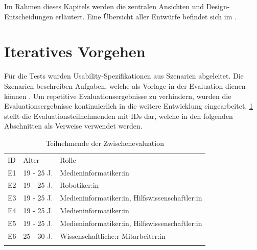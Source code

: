 Im Rahmen dieses Kapitels werden die zentralen Ansichten und
Design-Entscheidungen erläutert. Eine Übersicht aller Entwürfe befindet sich im
.

\section{Iteratives Vorgehen}
Für die Tests wurden Usability-Spezifikationen aus Szenarien abgeleitet. Die
Szenarien beschreiben Aufgaben, welche als Vorlage in der Evaluation dienen
können . Um repetitive
Evaluationsergebnisse zu verhindern, wurden die Evaluationsergebnisse
kontinuierlich in die weitere Entwicklung eingearbeitet. \ref{table:e} stellt
die Evaluationsteilnehmenden mit IDs dar, welche in den folgenden Abschnitten
als Verweise verwendet werden.

\begin{table}[h]
    \centering
    \caption{Teilnehmende der Zwischenevaluation}
    \begin{tabular}{lll}
        \arrayrulecolor{maincolor}\hline
        \sffamily\color{maincolor}ID & \sffamily\color{maincolor}Alter &
        \sffamily\color{maincolor}Rolle
        \\
        \arrayrulecolor{maincolor}\hline
        E1                           & 19 - 25 J.                      &
        Medieninformatiker:in
        \\
        E2                           & 19 - 25 J.                      &
        Robotiker:in                                                     \\
        E3                           & 19 - 25 J.                      &
        Medieninformatiker:in, Hilfswissenschaftler:in                   \\
        E4                           & 19 - 25 J.                      &
        Medieninformatiker:in                                            \\
        E5                           & 19 - 25 J.                      &
        Medieninformatiker:in, Hilfswissenschaftler:in
        \\
        E6                           & 25 - 30 J.                      &
        Wissenschaftliche:r Mitarbeiter:in                               \\
        \arrayrulecolor{maincolor}\hline
    \end{tabular}
    \label{table:e}
\end{table}

